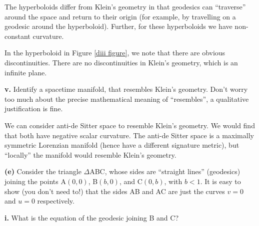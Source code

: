 \documentclass[a4paper]{article} %
\begin{document}
The hyperboloids differ from Klein's geometry in that geodesics can ``traverse'' around the space and return to their origin (for example, by travelling on a geodesic around the hyperboloid). Further, for these hyperboloids we have non-constant curvature.

In the hyperboloid in Figure \ref{diii figure}, we note that there are obvious discontinuities. There are no discontinuities in Klein's geometry, which is an infinite plane.



\begin{framed}
\textbf{v.} Identify a spacetime manifold, that resembles Klein's geometry. Don’t worry too much about the precise mathematical meaning of ``resembles'', a qualitative justification is fine.
\end{framed}

We can consider anti-de Sitter space to resemble Klein's geometry. We would find that both have negative scalar curvature. The anti-de Sitter space is a maximally symmetric Lorenzian manifold (hence have a different signature metric), but ``locally'' the manifold would resemble Klein's geometry.


\begin{framed}
\textbf{(e)} Consider the triangle $\Delta$ABC, whose sides are ``straight lines'' (geodesics) joining the points A$(0,0)$, B$(b,0)$, and C$(0,b)$, with $b<1$. It is easy to show (you don't need to!) that the sides AB and AC are just the curves $v=0$ and $u=0$ respectively.
\end{framed}

\begin{framed}
\textbf{i.} What is the equation of the geodesic joining B and C?
\end{framed}
\end{document}
